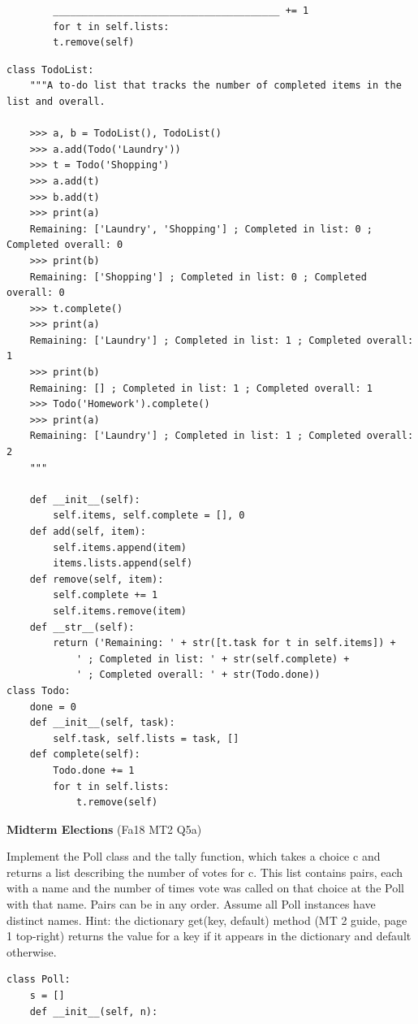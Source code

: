 \documentclass{exam}
\newlength{\currentparskip}
\newenvironment{blocksection}
{
    \setlength{\currentparskip}{\parskip}%
    \begin{minipage}{\linewidth}
    \setlength{\parskip}{\currentparskip}%
}
{
    \end{minipage}
}
\begin{document}
\begin{questions}
\begin{blocksection}
\begin{lstlisting}
        _______________________________________ += 1
        for t in self.lists:
        t.remove(self)
    \end{lstlisting}
\end{blocksection}
\begin{solution}
    \begin{lstlisting}
class TodoList:
    """A to-do list that tracks the number of completed items in the list and overall.

    >>> a, b = TodoList(), TodoList()
    >>> a.add(Todo('Laundry'))
    >>> t = Todo('Shopping')
    >>> a.add(t)
    >>> b.add(t)
    >>> print(a)
    Remaining: ['Laundry', 'Shopping'] ; Completed in list: 0 ; Completed overall: 0
    >>> print(b)
    Remaining: ['Shopping'] ; Completed in list: 0 ; Completed overall: 0
    >>> t.complete()
    >>> print(a)
    Remaining: ['Laundry'] ; Completed in list: 1 ; Completed overall: 1
    >>> print(b)
    Remaining: [] ; Completed in list: 1 ; Completed overall: 1
    >>> Todo('Homework').complete()
    >>> print(a)
    Remaining: ['Laundry'] ; Completed in list: 1 ; Completed overall: 2
    """
        
    def __init__(self):
        self.items, self.complete = [], 0
    def add(self, item):
        self.items.append(item)
        items.lists.append(self)
    def remove(self, item):
        self.complete += 1
        self.items.remove(item)
    def __str__(self):
        return ('Remaining: ' + str([t.task for t in self.items]) + 
            ' ; Completed in list: ' + str(self.complete) +
            ' ; Completed overall: ' + str(Todo.done))
class Todo:
    done = 0
    def __init__(self, task):
        self.task, self.lists = task, []
    def complete(self):
        Todo.done += 1
        for t in self.lists:
            t.remove(self)
\end{lstlisting}
\end{solution}

\begin{blocksection}
\question \textbf{Midterm Elections} (Fa18 MT2 Q5a)

    Implement the Poll class and the tally function, which takes a choice c and returns a list
    describing the number of votes for c. This list contains pairs, each with a name and the number of times
    vote was called on that choice at the Poll with that name. Pairs can be in any order. Assume all Poll
    instances have distinct names. Hint: the dictionary get(key, default) method (MT 2 guide, page 1
    top-right) returns the value for a key if it appears in the dictionary and default otherwise.
\begin{lstlisting}
class Poll:
    s = []
    def __init__(self, n):


\end{lstlisting}
\end{blocksection}
\end{questions}
\end{document}
